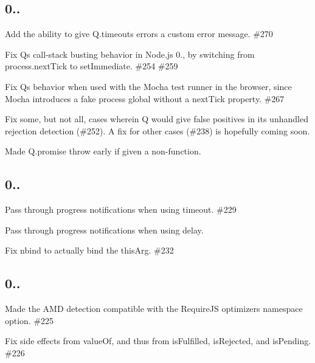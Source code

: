 \subsection*{0..}


\begin{DoxyItemize}
\item Add the ability to give {\ttfamily Q.\+timeout}\textquotesingle{}s errors a custom error message. \#270 
\item Fix Q\textquotesingle{}s call-\/stack busting behavior in Node.\+js 0., by switching from {\ttfamily process.\+next\+Tick} to {\ttfamily set\+Immediate}. \#254 \#259
\item Fix Q\textquotesingle{}s behavior when used with the Mocha test runner in the browser, since Mocha introduces a fake {\ttfamily process} global without a {\ttfamily next\+Tick} property. \#267
\item Fix some, but not all, cases wherein Q would give false positives in its unhandled rejection detection (\#252). A fix for other cases (\#238) is hopefully coming soon.
\item Made {\ttfamily Q.\+promise} throw early if given a non-\/function.
\end{DoxyItemize}

\subsection*{0..}


\begin{DoxyItemize}
\item Pass through progress notifications when using {\ttfamily timeout}. \#229 
\item Pass through progress notifications when using {\ttfamily delay}.
\item Fix {\ttfamily nbind} to actually bind the {\ttfamily this\+Arg}. \#232 
\end{DoxyItemize}

\subsection*{0..}


\begin{DoxyItemize}
\item Made the A\+MD detection compatible with the Require\+JS optimizer\textquotesingle{}s {\ttfamily namespace} option. \#225 
\item Fix side effects from {\ttfamily value\+Of}, and thus from {\ttfamily is\+Fulfilled}, {\ttfamily is\+Rejected}, and {\ttfamily is\+Pending}. \#226 
\end{DoxyItemize}

